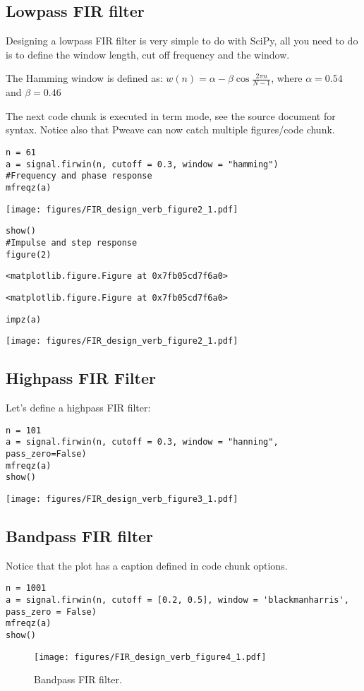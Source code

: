 \documentclass[a4paper,11pt,final]{article}
\begin{document}
\subsection{Lowpass FIR filter}

Designing a lowpass FIR filter is very simple to do with SciPy, all you
need to do is to define the window length, cut off frequency and the
window.

The Hamming window is defined as:
$w(n) = \alpha - \beta\cos\frac{2\pi n}{N-1}$, where $\alpha=0.54$ and
$\beta=0.46$

The next code chunk is executed in term mode, see the source document
for syntax. Notice also that Pweave can now catch multiple
figures/code chunk.


\begin{verbatim}
n = 61
a = signal.firwin(n, cutoff = 0.3, window = "hamming")
#Frequency and phase response
mfreqz(a)
\end{verbatim}
\texttt{[image: figures/FIR\_design\_verb\_figure2\_1.pdf]}

\begin{verbatim}
show()
#Impulse and step response
figure(2)
\end{verbatim}
\begin{verbatim}
<matplotlib.figure.Figure at 0x7fb05cd7f6a0>
\end{verbatim}
\begin{verbatim}
<matplotlib.figure.Figure at 0x7fb05cd7f6a0>
\end{verbatim}

\begin{verbatim}
impz(a)
\end{verbatim}
\texttt{[image: figures/FIR\_design\_verb\_figure2\_1.pdf]}


\subsection{Highpass FIR Filter}

Let's define a highpass FIR filter:


\begin{verbatim}
n = 101
a = signal.firwin(n, cutoff = 0.3, window = "hanning", pass_zero=False)
mfreqz(a)
show()
\end{verbatim}
\texttt{[image: figures/FIR\_design\_verb\_figure3\_1.pdf]}


\subsection{Bandpass FIR filter}

Notice that the plot has a caption defined in code chunk options.



\begin{verbatim}
n = 1001
a = signal.firwin(n, cutoff = [0.2, 0.5], window = 'blackmanharris', pass_zero = False)
mfreqz(a)
show()
\end{verbatim}
\begin{figure}[htpb]
\center
\texttt{[image: figures/FIR\_design\_verb\_figure4\_1.pdf]}
\caption{Bandpass FIR filter.}
\label{fig:None}
\end{figure}
\end{document}
